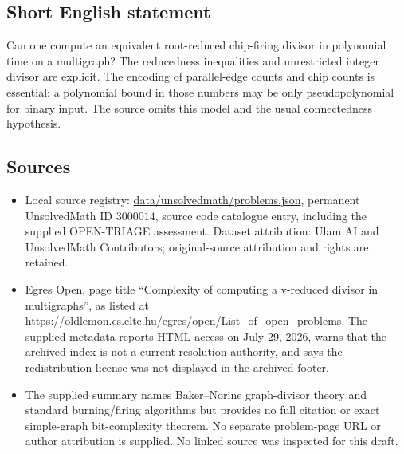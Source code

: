 \documentclass[11pt]{article}
\begin{document}
\subsection{Short English statement}
Can one compute an equivalent root-reduced chip-firing divisor in polynomial time on a multigraph? The reducedness inequalities and unrestricted integer divisor are explicit. The encoding of parallel-edge counts and chip counts is essential: a polynomial bound in those numbers may be only pseudopolynomial for binary input. The source omits this model and the usual connectedness hypothesis.
\subsection{Sources}
\begin{itemize}
\item Local source registry: \url{data/unsolvedmath/problems.json}, permanent UnsolvedMath ID $3000014$, source code catalogue entry, including the supplied OPEN-TRIAGE assessment. Dataset attribution: Ulam AI and UnsolvedMath Contributors; original-source attribution and rights are retained.
\item Egres Open, page title ``Complexity of computing a v-reduced divisor in multigraphs'', as listed at \url{https://oldlemon.cs.elte.hu/egres/open/List_of_open_problems}. The supplied metadata reports HTML access on July 29, 2026, warns that the archived index is not a current resolution authority, and says the redistribution license was not displayed in the archived footer.
\item The supplied summary names Baker--Norine graph-divisor theory and standard burning/firing algorithms but provides no full citation or exact simple-graph bit-complexity theorem. No separate problem-page URL or author attribution is supplied. No linked source was inspected for this draft.
\end{itemize}
\end{document}
